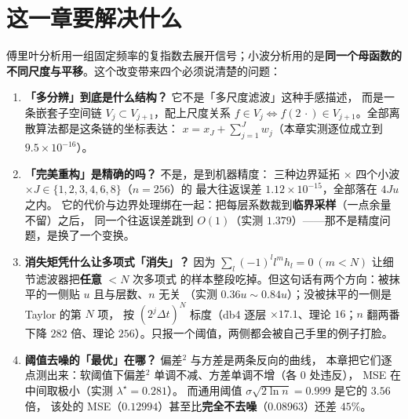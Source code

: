 % 


\section{这一章要解决什么}

傅里叶分析用一组固定频率的复指数去展开信号；小波分析用的是\textbf{同一个母函数的
不同尺度与平移}。这个改变带来四个必须说清楚的问题：

\begin{enumerate}
  \item \textbf{「多分辨」到底是什么结构？} 它不是「多尺度滤波」这种手感描述，
        而是一条嵌套子空间链 $V_j\subset V_{j+1}$，配上尺度关系
        $f\in V_j\iff f(2\,\cdot)\in V_{j+1}$。全部离散算法都是这条链的坐标表达：
        $x=x_J+\sum_{j=1}^{J}w_j$（本章实测逐位成立到 $9.5\times10^{-16}$）。
  \item \textbf{「完美重构」是精确的吗？} 不是，是到机器精度：
        三种边界延拓 $\times$ 四个小波 $\times J\in\{1,2,3,4,6,8\}$（$n=256$）的
        最大往返误差 $1.12\times10^{-15}$，全部落在 $4Ju$ 之内。
        它的代价与边界处理绑在一起：把每层系数裁到\textbf{临界采样}（一点余量不留）之后，
        同一个往返误差跳到 $O(1)$（实测 $1.379$）——那不是精度问题，是换了一个变换。
  \item \textbf{消失矩凭什么让多项式「消失」？} 因为
        $\sum_l(-1)^l l^m h_l=0\ (m<N)$ 让细节滤波器把\textbf{任意} $<N$ 次多项式
        的样本整段吃掉。但这句话有两个方向：被抹平的一侧贴 $u$ 且与层数、$n$ 无关
        （实测 $0.36u\sim0.84u$）；没被抹平的一侧是 Taylor 的第 $N$ 项，
        按 $(2^j\Delta t)^N$ 标度（db4 逐层 $\times17.1$、理论 $16$；$n$ 翻两番
        下降 $282$ 倍、理论 $256$）。只报一个阈值，两侧都会被自己手里的例子打脸。
  \item \textbf{阈值去噪的「最优」在哪？} 偏差$^2$ 与方差是两条反向的曲线，
        本章把它们逐点测出来：软阈值下偏差$^2$ 单调不减、方差单调不增（各 $0$ 处违反），
        MSE 在中间取极小（实测 $\lambda^\star=0.281$）。
        而通用阈值 $\sigma\sqrt{2\ln n}=0.999$ 是它的 $3.56$ 倍，
        该处的 MSE（$0.12994$）甚至比\textbf{完全不去噪}（$0.08963$）还差 $45\%$。
\end{enumerate}

